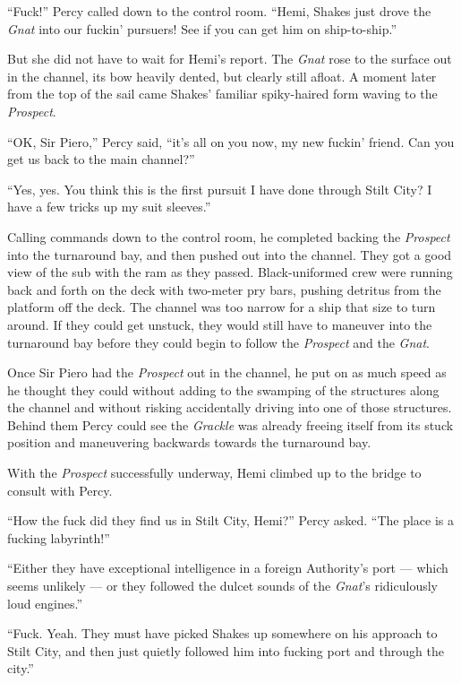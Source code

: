 \documentclass[
]{scrbook}
\begin{document}
``Fuck!'' Percy called down to the control room. ``Hemi, Shakes just
drove the \emph{Gnat} into our fuckin' pursuers! See if you can get him
on ship-to-ship.''

But she did not have to wait for Hemi's report. The \emph{Gnat} rose to
the surface out in the channel, its bow heavily dented, but clearly
still afloat. A moment later from the top of the sail came Shakes'
familiar spiky-haired form waving to the \emph{Prospect}.

``OK, Sir Piero,'' Percy said, ``it's all on you now, my new fuckin'
friend. Can you get us back to the main channel?''

``Yes, yes. You think this is the first pursuit I have done through
Stilt City? I have a few tricks up my suit sleeves.''

Calling commands down to the control room, he completed backing the
\emph{Prospect} into the turnaround bay, and then pushed out into the
channel. They got a good view of the sub with the ram as they passed.
Black-uniformed crew were running back and forth on the deck with
two-meter pry bars, pushing detritus from the platform off the deck. The
channel was too narrow for a ship that size to turn around. If they
could get unstuck, they would still have to maneuver into the turnaround
bay before they could begin to follow the \emph{Prospect} and the
\emph{Gnat}.

Once Sir Piero had the \emph{Prospect} out in the channel, he put on as
much speed as he thought they could without adding to the swamping of
the structures along the channel and without risking accidentally
driving into one of those structures. Behind them Percy could see the
\emph{Grackle} was already freeing itself from its stuck position and
maneuvering backwards towards the turnaround bay.

With the \emph{Prospect} successfully underway, Hemi climbed up to the
bridge to consult with Percy.

``How the fuck did they find us in Stilt City, Hemi?'' Percy asked.
``The place is a fucking labyrinth!''

``Either they have exceptional intelligence in a foreign Authority's
port --- which seems unlikely --- or they followed the dulcet sounds of
the \emph{Gnat}'s ridiculously loud engines.''

``Fuck. Yeah. They must have picked Shakes up somewhere on his approach
to Stilt City, and then just quietly followed him into fucking port and
through the city.''
\end{document}
